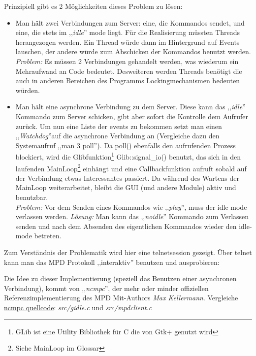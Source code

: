 Prinzipiell gibt es 2 Möglichkeiten dieses Problem zu lösen:
\begin{itemize}
    \item Man hält zwei Verbindungen zum Server: eine, die Kommandos sendet, und eine, die stets im ,,\textit{idle}'' mode liegt.
        Für die Realisierung müssten Threads herangezogen werden. Ein Thread würde dann im Hintergrund auf Events lauschen,
        der andere würde zum Abschicken der Kommandos benutzt werden.
        \emph{Problem:} Es müssen 2 Verbindungen gehandelt werden, was wiederum ein Mehraufwand an Code bedeutet.
        Desweiteren werden Threads benötigt die auch in anderen Bereichen des Programms Lockingmechanismen bedeuten würden.
    \item Man hält eine asynchrone Verbindung zu dem Server.
        Diese kann das ,,\textit{idle}'' Kommando zum Server schicken, gibt aber sofort die Kontrolle dem Aufrufer zurück. Um nun eine Liste der events zu bekommen setzt man 
        einen ,,\textit{Watchdog}''auf die asynchrone Verbindung an (Vergleiche dazu den Systemaufruf ,,man 3 poll'').
        Da poll() ebenfalls den aufrufenden Prozess blockiert, wird die Glibfunktion\footnote{GLib ist eine Utility Bibliothek für C die von Gtk+ genutzt wird} Glib::signal\_io() benutzt, das sich in den laufenden MainLoop\footnote{Siehe MainLoop im Glossar} einhängt und eine 
        Callbackfunktion aufruft sobald auf der Verbindung etwas Interessantes passiert. Da während des Wartens der MainLoop
        weiterarbeitet, bleibt die GUI (und andere Module) aktiv und benutzbar.
        \\
        \emph{Problem:} Vor dem Senden eines Kommandos wie ,,\textit{play}'', muss der idle mode verlassen werden.
        \emph{Lösung:} Man kann das ,,\textit{noidle}'' Kommando zum Verlassen senden und nach dem Absenden des eigentlichen Kommandos wieder den idle-mode betreten.
\end{itemize}

Zum Verständnis der Problematik wird hier eine telnetsession gezeigt. 
Über telnet kann man das MPD Protokoll ,,interaktiv'' benutzen und ausprobieren: 


Die Idee zu dieser Implementierung (speziell das Benutzen einer asynchronen Verbindung), kommt von ,,\textit{ncmpc}'',
der mehr oder minder offiziellen Referenzimplementierung des MPD Mit-Authors \emph{Max Kellermann}.
Vergleiche \href{http://mpd.wikia.com/wiki/Client:Ncmpc}{ncmpc quellcode}: \textit{src/gidle.c} und \textit{src/mpdclient.c}



